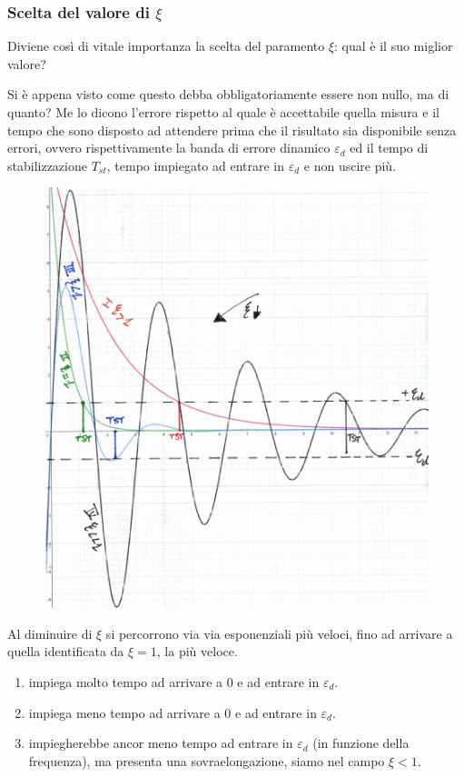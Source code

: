\documentclass[a4paper, 15pt]{article}
\begin{document}
\subsubsection{Scelta del valore di $\xi$} 	
\begin{adjustwidth}{2in}{} 		
	Diviene così di vitale importanza la scelta del paramento $\xi$: qual è il suo miglior valore? \newline
	
	Si è appena visto come questo debba obbligatoriamente essere non nullo, ma di quanto? Me lo dicono l'errore rispetto al quale è accettabile quella misura e il tempo che sono disposto ad attendere prima che il risultato sia disponibile senza errori, ovvero rispettivamente la banda di errore dinamico $\varepsilon_d$ ed il tempo di stabilizzazione $T_{st}$, tempo impiegato ad entrare in $\varepsilon_d$ e non uscire più.
\begin{figure}[H]
	\centering
	\includegraphics[width=0.5\linewidth]{fig/mm12}
	\label{fig:mm12}
\end{figure}
	Al diminuire di $\xi$ si percorrono via via esponenziali più veloci, fino ad arrivare a quella identificata da $\xi=1$, la più veloce. 

	\begin{enumerate}[label=\Roman*.]
	\item impiega molto tempo ad arrivare a $0$ e ad entrare in $\varepsilon_d$.
	
	\item impiega meno tempo ad arrivare a $0$ e ad entrare in $\varepsilon_d$.
	
	\item impiegherebbe ancor meno tempo ad entrare in $\varepsilon_d$ (in funzione della frequenza), ma presenta una sovraelongazione, siamo nel campo $\xi<1$. \newline
	

\end{enumerate}
\end{adjustwidth}
\end{document}
